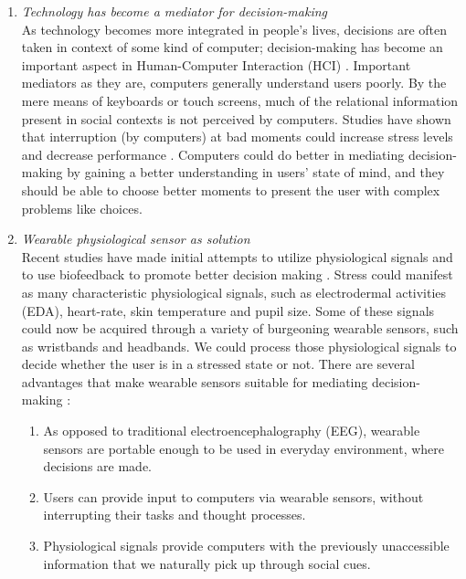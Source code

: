 \documentclass[12pt]{article}
\begin{document}
\begin{enumerate}
\item{\it Technology has become a mediator for decision-making}\\
As technology becomes more integrated in people's lives, decisions are often taken in context of some kind of computer; decision-making has become an important aspect in Human-Computer Interaction (HCI) \parencite{Zhou2015}.
Important mediators as they are, computers generally understand users poorly. By the mere means of keyboards or touch screens, much of the relational information present in social contexts is not perceived by computers. Studies have shown that interruption (by computers) at bad moments could increase stress levels and decrease performance \parencite{Carton2009}. 
Computers could do better in mediating decision-making by gaining a better understanding in users' state of mind, and they should be able to choose better moments to present the user with complex problems like choices.\\


\item{\it Wearable physiological sensor as solution}\\
Recent studies have made initial attempts to utilize physiological signals and to use biofeedback to promote better decision making \parencite{Carroll2013, Zhou2015}. 
  Stress could manifest as many characteristic physiological signals, such as electrodermal activities (EDA), heart-rate, skin temperature and pupil size. 
  Some of these signals could now be acquired through a variety of burgeoning wearable sensors, such as wristbands and headbands. We could process those physiological signals to decide whether the user is in a stressed state or not. There are several advantages that make wearable sensors suitable for mediating decision-making \parencite{Peck2014}:
  \begin{enumerate} 
  \itemsep0pt\parskip0pt
    \item As opposed to traditional electroencephalography (EEG), wearable sensors are portable enough to be used in everyday  environment, where decisions are made.
    \item Users can provide input to computers via wearable sensors, without interrupting their tasks and thought processes.
    \item Physiological signals provide computers with the previously unaccessible  information that we naturally pick up through social cues.
  \end{enumerate}
\end{enumerate}
\end{document}
